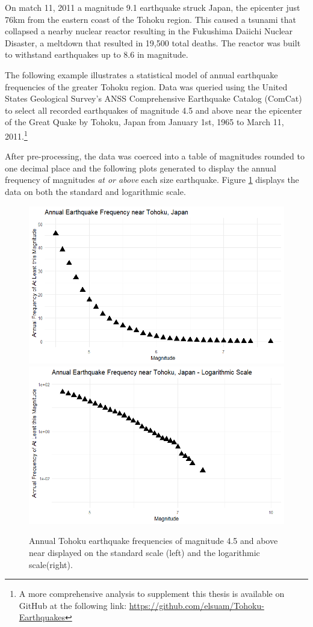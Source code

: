 

On match 11, 2011 a magnitude 9.1 earthquake struck Japan, the epicenter just 76km from the eastern coast of the Tohoku region.  This caused a tsunami that collapsed a nearby nuclear reactor resulting in the Fukushima Daiichi Nuclear Disaster, a meltdown that resulted in 19,500 total deaths.  The reactor was built to withstand earthquakes up to 8.6 in magnitude.

The following example illustrates a statistical model of annual earthquake frequencies of the greater Tohoku region.
Data was queried using the United States Geological Survey's ANSS Comprehensive Earthquake Catalog (ComCat)
to select all recorded earthquakes of magnitude 4.5 and above near the epicenter of the Great Quake by Tohoku, Japan from January 1st, 1965 to March 11, 2011.\footnote{A more comprehensive analysis to supplement this thesis is available on GitHub at the following link: 
\url{https://github.com/elsuam/Tohoku-Earthquakes}}

After pre-processing, the data was coerced into a table of magnitudes rounded to one decimal place and the following plots generated to display the annual frequency of magnitudes \textit{at or above} each size earthquake.  Figure \ref{tohoku_unfit} displays the data on both the standard and logarithmic scale.

\begin{figure}[H]
    \includegraphics[width=0.5\linewidth]{Figures/tohoku_standardscale.png}
    \includegraphics[width=0.5\linewidth]{Figures/tohoku_logscale.png}
    \caption{\footnotesize{Annual Tohoku earthquake frequencies of magnitude 4.5 and above near displayed on the standard scale (left) and the logarithmic scale(right).}}
    \label{tohoku_unfit}
\end{figure}


